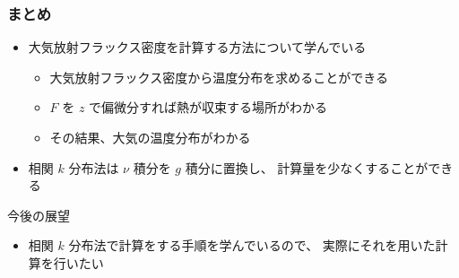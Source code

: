\documentclass[unicode,colorlinks]{beamer}
\begin{document}
\begin{frame}
	\frametitle{まとめ}
	\begin{itemize}
		\item 大気放射フラックス密度を計算する方法について学んでいる
		\begin{itemize}
			\item 大気放射フラックス密度から温度分布を求めることができる
			\item $F$ を $z$ で偏微分すれば熱が収束する場所がわかる
			\item その結果、大気の温度分布がわかる
		\end{itemize}
		\item 相関 $k$ 分布法は $\nu$ 積分を $g$ 積分に置換し、
			計算量を少なくすることができる
	\end{itemize}

	\begin{block}{今後の展望}
		\begin{itemize}
			\item 相関 $k$ 分布法で計算をする手順を学んでいるので、
				実際にそれを用いた計算を行いたい
		\end{itemize}
	\end{block}
\end{frame}
\end{document}
